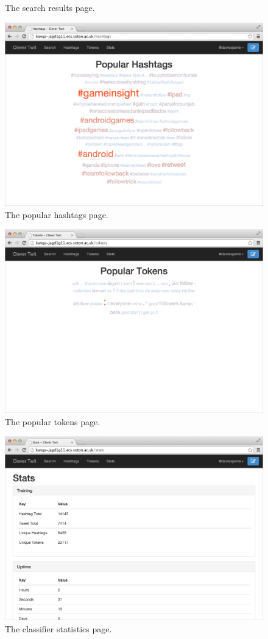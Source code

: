 \documentclass[11pt,a4paper]{report}
\begin{document}
\begin{subappendices}
\begin{figure}[htpb]
    \caption{The search results page.}
    \label{fig:screenshots:results}
\end{figure}
\begin{figure}[htpb]
    \centering
    \includegraphics[width=0.75\linewidth]{screenshots/hashtags2.png}
    \caption{The popular hashtags page.}
    \label{fig:screenshots:hashtags}
\end{figure}
\begin{figure}[htpb]
    \centering
    \includegraphics[width=0.75\linewidth]{screenshots/tokens2.png}
    \caption{The popular tokens page.}
    \label{fig:screenshots:tokens}
\end{figure}
\begin{figure}[htpb]
    \centering
    \includegraphics[width=0.75\linewidth]{screenshots/stats2.png}
    \caption{The classifier statistics page.}
    \label{fig:screenshots:stats}
\end{figure}
\pagebreak


\end{subappendices}
\end{document}
